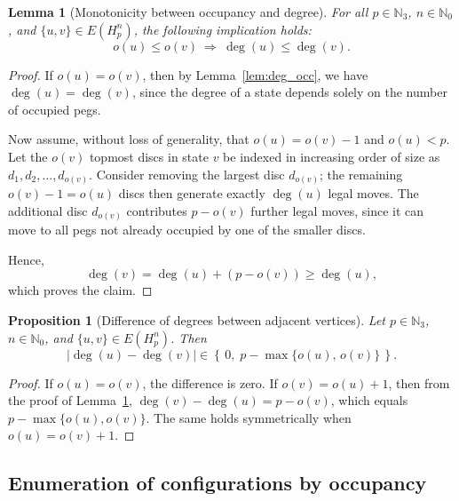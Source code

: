 \documentclass[letterpaper,12pt]{article}
\newtheorem{lemma}{Lemma}
\newtheorem{proposition}{Proposition}
\begin{document}
\begin{lemma}[Monotonicity between occupancy and degree]\label{lemma:O_D}
For all $p \in \mathbb{N}_3$, $n \in \mathbb{N}_0$, and $\{u, v\} \in E(H_p^n)$, the following implication holds:
\begin{equation}
    o(u) \leq o(v) \ \Longrightarrow\ \deg(u) \leq \deg(v).
\end{equation}
\end{lemma}

\begin{proof}
If $o(u) = o(v)$, then by Lemma~\ref{lem:deg_occ}, we have $\deg(u) = \deg(v)$, since the degree of a state depends solely on the number of occupied pegs.

Now assume, without loss of generality, that $o(u) = o(v) - 1$ and $o(u) < p$.  
Let the $o(v)$ topmost discs in state $v$ be indexed in increasing order of size as $d_1, d_2, \dots, d_{o(v)}$.  
Consider removing the largest disc $d_{o(v)}$; the remaining $o(v) - 1 = o(u)$ discs then generate exactly $\deg(u)$ legal moves.  
The additional disc $d_{o(v)}$ contributes $p - o(v)$ further legal moves, since it can move to all pegs not already occupied by one of the smaller discs.

Hence,
\[
\deg(v) = \deg(u) + (p - o(v)) \geq \deg(u),
\]
which proves the claim.
\end{proof}

 

\begin{proposition}[Difference of degrees between adjacent vertices]\label{prop:deg-diff}
Let $p \in \mathbb{N}_3$, $n \in \mathbb{N}_0$, and $\{u, v\} \in E(H_p^n)$. Then
\begin{equation}
    |\deg(u) - \deg(v)| \in \left\{\, 0,\; p - \max\{o(u),\, o(v)\} \,\right\}.
\end{equation}
\end{proposition}


\begin{proof}
If \(o(u)=o(v)\), the difference is zero.  
If \(o(v)=o(u)+1\), then from the proof of Lemma~\ref{lemma:O_D},
\(\deg(v)-\deg(u)=p-o(v)\), which equals \(p-\max\{o(u),o(v)\}\).  
The same holds symmetrically when \(o(u)=o(v)+1\).
\end{proof}
 



\subsection{Enumeration of configurations by occupancy}
\end{document}
